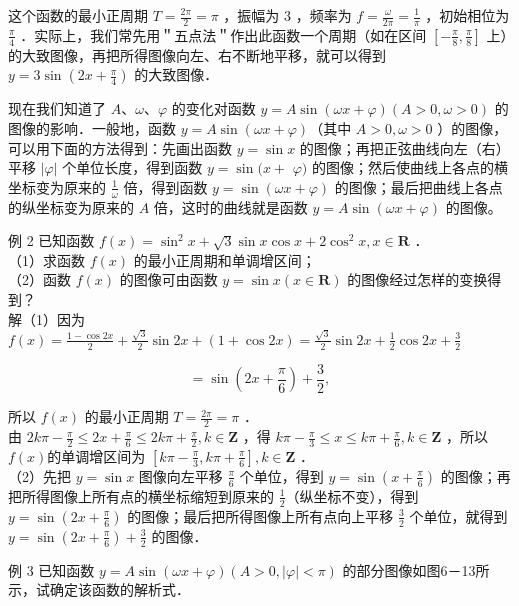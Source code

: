 \documentclass[10pt]{article}
\begin{document}
这个函数的最小正周期 \(T=\frac{2 \pi}{2}=\pi\) ，振幅为 3 ，频率为 \(f=\frac{\omega}{2 \pi}=\frac{1}{\pi}\) ，初始相位为 \(\frac{\pi}{4}\) ．实际上，我们常先用＂五点法＂作出此函数一个周期（如在区间 \(\left[-\frac{\pi}{8}, \frac{\pi}{8}\right]\) 上）的大致图像，再把所得图像向左、右不断地平移，就可以得到 \(y=3 \sin \left(2 x+\frac{\pi}{4}\right)\) 的大致图像．

现在我们知道了 \(A 、 \omega 、 \varphi\) 的变化对函数 \(y=A \sin (\omega x+\varphi)(A>0, \omega>0)\) 的图像的影响．一般地，函数 \(y=A \sin (\omega x+\varphi)\)（其中 \(A>0, \omega>0\) ）的图像，可以用下面的方法得到：先画出函数 \(y=\sin x\) 的图像；再把正弦曲线向左（右）平移 \(|\varphi|\) 个单位长度，得到函数 \(y=\sin (x+\) \(\varphi)\) 的图像；然后使曲线上各点的横坐标变为原来的 \(\frac{1}{\omega}\) 倍，得到函数 \(y=\sin (\omega x+\varphi)\) 的图像；最后把曲线上各点的纵坐标变为原来的 \(A\) 倍，这时的曲线就是函数 \(y=A \sin (\omega x+\varphi)\) 的图像。

例 2 已知函数 \(f(x)=\sin ^{2} x+\sqrt{3} \sin x \cos x+2 \cos ^{2} x, x \in \mathbf{R}\) ．\\
（1）求函数 \(f(x)\) 的最小正周期和单调增区间；\\
（2）函数 \(f(x)\) 的图像可由函数 \(y=\sin x(x \in \mathbf{R})\) 的图像经过怎样的变换得到？\\
解（1）因为 \(f(x)=\frac{1-\cos 2 x}{2}+\frac{\sqrt{3}}{2} \sin 2 x+(1+\cos 2 x)=\frac{\sqrt{3}}{2} \sin 2 x+\frac{1}{2} \cos 2 x+\frac{3}{2}\)

\[
=\sin \left(2 x+\frac{\pi}{6}\right)+\frac{3}{2},
\]

所以 \(f(x)\) 的最小正周期 \(T=\frac{2 \pi}{2}=\pi\) ．\\
由 \(2 k \pi-\frac{\pi}{2} \leqslant 2 x+\frac{\pi}{6} \leqslant 2 k \pi+\frac{\pi}{2}, k \in \mathbf{Z}\) ，得 \(k \pi-\frac{\pi}{3} \leqslant x \leqslant k \pi+\frac{\pi}{6}, k \in \mathbf{Z}\) ，所以 \(f(x)\)的单调增区间为 \(\left[k \pi-\frac{\pi}{3}, k \pi+\frac{\pi}{6}\right], k \in \mathbf{Z}\) ．\\
（2）先把 \(y=\sin x\) 图像向左平移 \(\frac{\pi}{6}\) 个单位，得到 \(y=\sin \left(x+\frac{\pi}{6}\right)\) 的图像；再把所得图像上所有点的横坐标缩短到原来的 \(\frac{1}{2}\)（纵坐标不变），得到 \(y=\sin \left(2 x+\frac{\pi}{6}\right)\) 的图像；最后把所得图像上所有点向上平移 \(\frac{3}{2}\) 个单位，就得到 \(y=\sin \left(2 x+\frac{\pi}{6}\right)+\frac{3}{2}\) 的图像．

例 3 已知函数 \(y=A \sin (\omega x+\varphi)(A>0,|\varphi|<\pi)\) 的部分图像如图6－13所示，试确定该函数的解析式．
\end{document}

